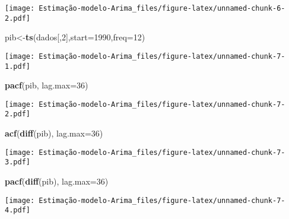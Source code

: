 \documentclass[]{article}
\newenvironment{Shaded}{\begin{snugshade}}{\end{snugshade}}
\newcommand{\CommentTok}[1]{\textcolor[rgb]{0.56,0.35,0.01}{\textit{#1}}}
\newcommand{\DataTypeTok}[1]{\textcolor[rgb]{0.13,0.29,0.53}{#1}}
\newcommand{\DecValTok}[1]{\textcolor[rgb]{0.00,0.00,0.81}{#1}}
\newcommand{\KeywordTok}[1]{\textcolor[rgb]{0.13,0.29,0.53}{\textbf{#1}}}
\newcommand{\NormalTok}[1]{#1}
\begin{document}
\texttt{[image: Estimação-modelo-Arima\_files/figure-latex/unnamed-chunk-6-2.pdf]}

\begin{Shaded}
\begin{Highlighting}[]
\NormalTok{pib<-}\KeywordTok{ts}\NormalTok{(dados[,}\DecValTok{2}\NormalTok{],}\DataTypeTok{start=}\DecValTok{1990}\NormalTok{,}\DataTypeTok{freq=}\DecValTok{12}\NormalTok{)}
\end{Highlighting}
\end{Shaded}

\begin{Shaded}
\end{Shaded}

\texttt{[image: Estimação-modelo-Arima\_files/figure-latex/unnamed-chunk-7-1.pdf]}

\begin{Shaded}
\begin{Highlighting}[]
\KeywordTok{pacf}\NormalTok{(pib, }\DataTypeTok{lag.max=}\DecValTok{36}\NormalTok{)}
\end{Highlighting}
\end{Shaded}

\texttt{[image: Estimação-modelo-Arima\_files/figure-latex/unnamed-chunk-7-2.pdf]}

\begin{Shaded}
\begin{Highlighting}[]
\KeywordTok{acf}\NormalTok{(}\KeywordTok{diff}\NormalTok{(pib), }\DataTypeTok{lag.max=}\DecValTok{36}\NormalTok{)}
\end{Highlighting}
\end{Shaded}

\texttt{[image: Estimação-modelo-Arima\_files/figure-latex/unnamed-chunk-7-3.pdf]}

\begin{Shaded}
\begin{Highlighting}[]
\KeywordTok{pacf}\NormalTok{(}\KeywordTok{diff}\NormalTok{(pib), }\DataTypeTok{lag.max=}\DecValTok{36}\NormalTok{) }
\end{Highlighting}
\end{Shaded}

\texttt{[image: Estimação-modelo-Arima\_files/figure-latex/unnamed-chunk-7-4.pdf]}
\end{document}
